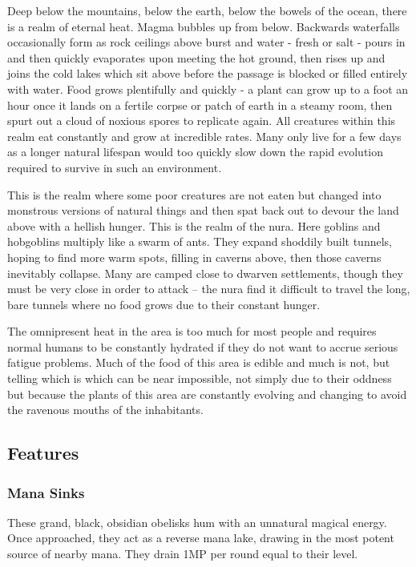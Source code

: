 Deep below the mountains, below the earth, below the bowels of the ocean, there is a realm of eternal heat.  Magma bubbles up from below.  Backwards waterfalls occasionally form as rock ceilings above burst and water - fresh or salt - pours in and then quickly evaporates upon meeting the hot ground, then rises up and joins the cold lakes which sit above before the passage is blocked or filled entirely with water.  Food grows plentifully and quickly - a plant can grow up to a foot an hour once it lands on a fertile corpse or patch of earth in a steamy room, then spurt out a cloud of noxious spores to replicate again.  All creatures within this realm eat constantly and grow at incredible rates.  Many only live for a few days as a longer natural lifespan would too quickly slow down the rapid evolution required to survive in such an environment.

	This is the realm where some poor creatures are not eaten but changed into monstrous versions of natural things and then spat back out to devour the land above with a hellish hunger.  This is the realm of the nura.  Here goblins and hobgoblins multiply like a swarm of ants.  They expand shoddily built tunnels, hoping to find more warm spots, filling in caverns above, then those caverns inevitably collapse.  Many are camped close to dwarven settlements, though they must be very close in order to attack -- the nura find it difficult to travel the long, bare tunnels where no food grows due to their constant hunger.

	The omnipresent heat in the area is too much for most people and requires normal humans to be constantly hydrated if they do not want to accrue serious fatigue problems.  Much of the food of this area is edible and much is not, but telling which is which can be near impossible, not simply due to their oddness but because the plants of this area are constantly evolving and changing to avoid the ravenous mouths of the inhabitants.

\subsection{Features}
\subsubsection{Mana Sinks}
These grand, black, obsidian obelisks hum with an unnatural magical energy.  Once approached, they act as a reverse mana lake, drawing in the most potent source of nearby mana.  They drain 1MP per round equal to their level.

